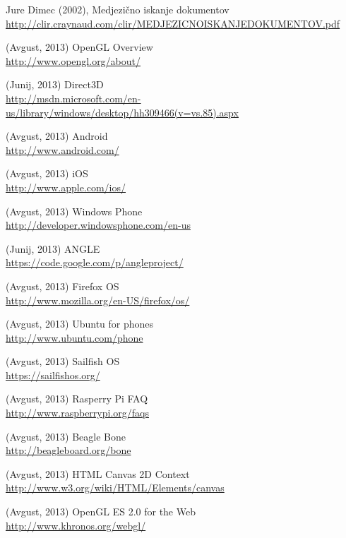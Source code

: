 \begin{thebibliography}{1}


 Jure Dimec (2002), Medjezično iskanje dokumentov 
\\ \url{http://clir.craynaud.com/clir/MEDJEZICNOISKANJEDOKUMENTOV.pdf}

 (Avgust, 2013) OpenGL Overview
\\ \url{http://www.opengl.org/about/}

 (Junij, 2013) Direct3D
\\ \url{http://msdn.microsoft.com/en-us/library/windows/desktop/hh309466(v=vs.85).aspx}

 (Avgust, 2013) Android
\\ \url{http://www.android.com/}

 (Avgust, 2013) iOS
\\ \url{http://www.apple.com/ios/}

 (Avgust, 2013) Windows Phone
\\ \url{http://developer.windowsphone.com/en-us}

 (Junij, 2013) ANGLE
\\ \url{https://code.google.com/p/angleproject/}

 (Avgust, 2013) Firefox OS
\\ \url{http://www.mozilla.org/en-US/firefox/os/}

 (Avgust, 2013) Ubuntu for phones
\\ \url{http://www.ubuntu.com/phone}

 (Avgust, 2013) Sailfish OS
\\ \url{https://sailfishos.org/}

 (Avgust, 2013) Rasperry Pi FAQ
\\ \url{http://www.raspberrypi.org/faqs}

 (Avgust, 2013) Beagle Bone
\\ \url{http://beagleboard.org/bone}

 (Avgust, 2013) HTML Canvas 2D Context
\\ \url{http://www.w3.org/wiki/HTML/Elements/canvas}

 (Avgust, 2013) OpenGL ES 2.0 for the Web 
\\ \url{http://www.khronos.org/webgl/}


\end{thebibliography}
